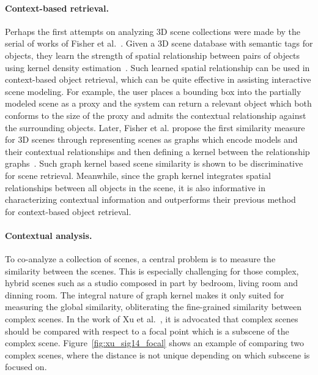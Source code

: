 \paragraph*{Context-based retrieval.}
Perhaps the first attempts on analyzing 3D scene collections were made by the serial of works of
Fisher et al.~.
Given a 3D scene database with semantic tags for objects, they learn the strength of spatial relationship
between pairs of objects using kernel density estimation~\cite{Fisher:2010:CSM}. Such learned spatial relationship
can be used in context-based object retrieval, which can be quite effective in assisting interactive scene modeling.
For example, the user places a bounding box into the partially modeled scene as a proxy and the system
can return a relevant object which both conforms to the size of the proxy and admits the contextual relationship against
the surrounding objects.
%
Later, Fisher et al. propose the first similarity measure for 3D scenes through
representing scenes as graphs which encode models and their contextual relationships and then
defining a kernel between the relationship graphs~\cite{Fisher:2011:CSR}.
Such graph kernel based scene similarity is shown to be discriminative for scene retrieval.
Meanwhile, since the graph kernel integrates spatial relationships between all objects in the scene,
it is also informative in characterizing contextual information and outperforms their previous method~\cite{Fisher:2010:CSM}
for context-based object retrieval.



\paragraph*{Contextual analysis.}
To co-analyze a collection of scenes, a central problem is to measure the similarity between the scenes.
This is especially challenging for those complex, hybrid scenes such as a studio composed
in part by bedroom, living room and dinning room.
The integral nature of graph kernel makes it only suited for measuring the global similarity,
obliterating the fine-grained similarity between complex scenes.
In the work of Xu et al.~, it is advocated that complex scenes should be compared
with respect to a focal point which is a subscene of the complex scene.
Figure~\ref{fig:xu_sig14_focal} shows an example of comparing two complex scenes, where the distance is not unique
depending on which subscene is focused on.

